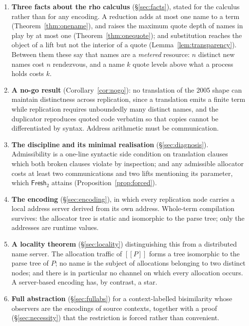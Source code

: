 \documentclass[11pt]{article}
\theoremstyle{definition}
\theoremstyle{plain}
\theoremstyle{remark}
\newcommand{\enc}[1]{[\![#1]\!]}
\newcommand{\Frsh}{\mathsf{Fresh}_2}
\begin{document}
\begin{enumerate}[label=(\roman*),leftmargin=2.2em]

\item \textbf{Three facts about the rho calculus} (\S\ref{sec:facts}),
stated for the calculus rather than for any encoding. A reduction adds at
most one name to a term (Theorem~\ref{thm:onename}), and raises the
maximum quote depth of names in play by at most one
(Theorem~\ref{thm:onequote}); and substitution reaches the object of a
lift but not the interior of a quote
(Lemma~\ref{lem:transparency}). Between them these say that names are a
\emph{metered} resource: $n$ distinct new names cost $n$ rendezvous, and a
name $k$ quote levels above what a process holds costs $k$.

\item \textbf{A no-go result} (Corollary~\ref{cor:nogo}): no translation
of the 2005 shape can maintain distinctness across replication, since a
translation emits a finite term while replication requires unboundedly
many distinct names, and the duplicator reproduces quoted code verbatim
so that copies cannot be differentiated by syntax. Address arithmetic
must be communication.

\item \textbf{The discipline and its minimal realisation}
(\S\ref{sec:diagnosis}). Admissibility is a one-line syntactic side
condition on translation clauses which both broken clauses violate by
inspection; and any admissible allocator costs at least two
communications and two lifts mentioning its parameter, which $\Frsh$
attains (Proposition~\ref{prop:forced}).

\item \textbf{The encoding} (\S\ref{sec:encoding}), in which every
replication node carries a local address server derived from its own
address. Whole-term compilation survives: the allocator tree is static
and isomorphic to the parse tree; only the addresses are runtime values.

\item \textbf{A locality theorem} (\S\ref{sec:locality}) distinguishing
this from a distributed name server. The allocation traffic of $\enc{P}$
forms a tree isomorphic to the parse tree of $P$; no name is the subject
of allocations belonging to two distinct nodes; and there is in
particular no channel on which every allocation occurs. A server-based
encoding has, by contrast, a star.

\item \textbf{Full abstraction} (\S\ref{sec:fullabs}) for a
context-labelled bisimilarity whose observers are the encodings of source
contexts, together with a proof (\S\ref{sec:necessity}) that the
restriction is forced rather than convenient.

\end{enumerate}
\end{document}
